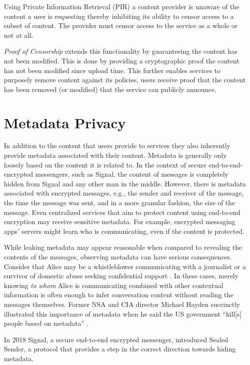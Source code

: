 Using Private Information Retrieval (PIR) a content provider is unaware of the
content a user is requesting thereby inhibiting its ability to censor access to
a subset of content. The provider must censor access to the service as a whole
or not at all.

\emph{Proof of Censorship} extends this functionality by guaranteeing the
content has not been modified. This is done by providing a cryptographic proof
the content has not been modified since upload time. This further enables
services to purposely remove content against its policies, users receive proof
that the content has been removed (or modified) that the service can publicly
announce.

\section{Metadata Privacy}
In addition to the content that users provide to services they also inherently
provide metadata associated with their content. Metadata is generally only
loosely based on the content it is related to. In the context of secure
end-to-end-encrypted messengers, such as Signal, the content of messages is
completely hidden from Signal and any other man in the middle. However, there is
metadata associated with encrypted messages, e.g., the sender and receiver of
the message, the time the message was sent, and in a more granular fashion, the
size of the message. Even centralized services that aim to protect content using
end-to-end encryption may receive sensitive metadata. For example, encrypted
messaging apps' servers might learn who is communicating, even if the content is
protected.

While leaking metadata may appear reasonable when compared to revealing the
contents of the messages, observing metadata can have serious consequences.
Consider that Alice may be a whistleblower communicating with a journalist
\cite{190976} or a survivor of domestic abuse seeking confidential support
\cite{236244}. In these cases, merely knowing \emph{to whom} Alice is
communicating combined with other contextual information is often enough to
infer conversation content without reading the messages themselves. Former NSA
and CIA director Michael Hayden succinctly illustrated this importance of
metadata when he said the US government ``kill[s] people based on metadata''
\cite{haydenmetadata}.

In 2018 Signal, a secure end-to-end encrypted messenger, introduced Sealed
Sender\cite{sealed-sender}, a protocol that provides a step in the correct
direction towards hiding metadata. 

